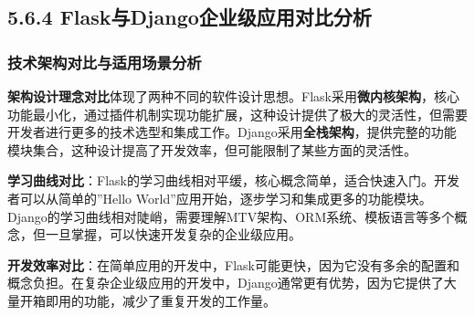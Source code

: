 \begin{Shaded}
\begin{Highlighting}[]
\OperatorTok{=}\NormalTok{ [}\NormalTok{, }\NormalTok{]}
    
\OperatorTok{=}\NormalTok{)}
\OperatorTok{=} 
\end{Highlighting}
\end{Shaded}

\subsection{5.6.4 Flask与Django企业级应用对比分析}\label{flaskux4e0edjangoux4f01ux4e1aux7ea7ux5e94ux7528ux5bf9ux6bd4ux5206ux6790}

\subsubsection{技术架构对比与适用场景分析}\label{ux6280ux672fux67b6ux6784ux5bf9ux6bd4ux4e0eux9002ux7528ux573aux666fux5206ux6790}

\textbf{架构设计理念对比}体现了两种不同的软件设计思想。Flask采用\textbf{微内核架构}，核心功能最小化，通过插件机制实现功能扩展，这种设计提供了极大的灵活性，但需要开发者进行更多的技术选型和集成工作。Django采用\textbf{全栈架构}，提供完整的功能模块集合，这种设计提高了开发效率，但可能限制了某些方面的灵活性。

\textbf{学习曲线对比}：Flask的学习曲线相对平缓，核心概念简单，适合快速入门。开发者可以从简单的''Hello World''应用开始，逐步学习和集成更多的功能模块。Django的学习曲线相对陡峭，需要理解MTV架构、ORM系统、模板语言等多个概念，但一旦掌握，可以快速开发复杂的企业级应用。

\textbf{开发效率对比}：在简单应用的开发中，Flask可能更快，因为它没有多余的配置和概念负担。在复杂企业级应用的开发中，Django通常更有优势，因为它提供了大量开箱即用的功能，减少了重复开发的工作量。


